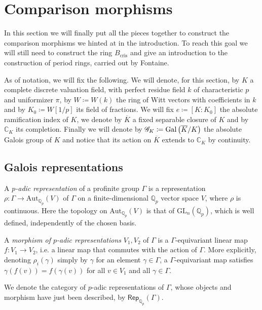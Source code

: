 \section{Comparison morphisms}
In this section we will finally put all the pieces together to construct
the comparison morphisms we hinted at in the introduction.
To reach this goal we will still need to construct the ring $B_{\mathrm{cris}}$
and give an introduction to the construction of period rings, carried out by Fontaine.

As of notation, we will fix the following.
We will denote, for this section, by $K$ a complete discrete valuation field, 
with perfect residue field $k$ of characteristic $p$ and uniformizer \(\pi\),
by $W \coloneqq W(k)$ the ring of Witt vectors with coefficients in $k$
and by $K_0 \coloneqq W[1/p]$ its field of fractions.
We will fix $e \coloneqq [ K : K_0 ]$ the absolute ramification index of $K$,
we denote by $\overline{K}$ a fixed separable closure of $K$
and by $\mathbb{C}_K$%
its completion.
Finally we will denote by $\mathscr{G}_K \coloneqq \operatorname{Gal}\left( \overline{K} / K \right)$ 
the absolute Galois group of $K$ and notice that its action on $\overline{K}$
extends to $\mathbb{C}_K$ by continuity.



\subsection{Galois representations}
\begin{defn}
	A \emph{$p$-adic representation} of a profinite group $\Gamma$ is a
	representation $\rho\colon \Gamma \to \mathrm{Aut}_{\mathbb{Q}_p}(V)$
	of $\Gamma$ on a finite-dimensional $\mathbb{Q}_p$ vector space
	$V$, where $\rho$ is continuous.
	Here the topology on $\mathrm{Aut}_{\mathbb{Q}_p}(V)$ is
	that of $\mathrm{GL}_n(\mathbb{Q}_p)$, which is well defined,
	independently of the chosen basis.

	A \emph{morphism of $p$-adic representations} $V_1, V_2$ of $\Gamma$
	is a $\Gamma$-equivariant linear map $f\colon V_1 \to V_2$, 
	i.e. a linear map that commutes with the action of $\Gamma$.
	More explicitly, denoting $\rho_i(\gamma)$ simply by $\gamma$ for
	an element $\gamma \in \Gamma$, a $\Gamma$-equivariant
	map satisfies $\gamma(f(v)) = f(\gamma(v))$
	for all $v \in V_1$ and all $\gamma \in \Gamma$.

	We denote the category of $p$-adic representations of $\Gamma$,
	whose objects and morphism have just been described,
	by $\mathsf{Rep}_{\mathbb{Q}_p}(\Gamma)$.
\end{defn}


